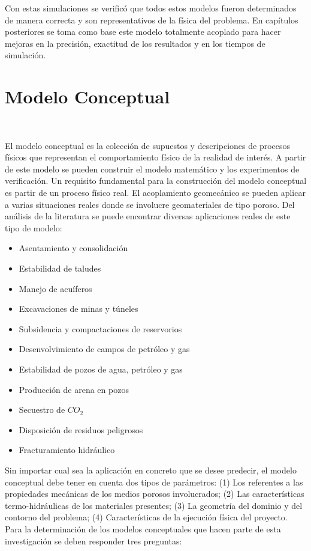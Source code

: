 Con estas simulaciones se verificó que todos estos modelos fueron determinados de manera correcta y son representativos de la física del problema. En capítulos posteriores se toma como base este modelo totalmente acoplado para hacer mejoras en la precisión, exactitud de los resultados y en los tiempos de simulación.


\section{Modelo Conceptual}~\hypertarget{sec:sec310}{}
\label{sec:sec310}

El modelo conceptual es la colección de supuestos y descripciones de procesos físicos que representan el comportamiento físico de la realidad de interés. A partir de este modelo se pueden construir el modelo matemático y los experimentos de verificación. Un requisito fundamental para la construcción del modelo conceptual es partir de un proceso físico real. El acoplamiento geomecánico se pueden aplicar a varias situaciones reales donde se involucre geomateriales de tipo poroso. Del análisis de la literatura se puede encontrar diversas aplicaciones reales de este tipo de modelo:


\begin{itemize}
    \item Asentamiento y consolidación
    \item Estabilidad de taludes
    \item Manejo de acuíferos
    \item Excavaciones de minas y túneles
    \item Subsidencia y compactaciones de reservorios
    \item Desenvolvimiento de campos de petróleo y gas
    \item Estabilidad de pozos de agua, petróleo y gas
    \item Producción de arena en pozos 
    \item Secuestro de $CO_{2}$
    \item Disposición de residuos peligrosos
    \item Fracturamiento hidráulico

\end{itemize}

Sin importar cual sea la aplicación en concreto que se desee predecir, el modelo conceptual debe tener en cuenta dos tipos de parámetros: (1) Los referentes a las propiedades mecánicas de los medios porosos involucrados; (2) Las características termo-hidráulicas de los materiales presentes; (3) La geometría del dominio y del contorno del problema; (4) Características de la ejecución física del proyecto. Para la determinación de los modelos conceptuales que hacen parte de esta investigación se deben responder tres preguntas:


